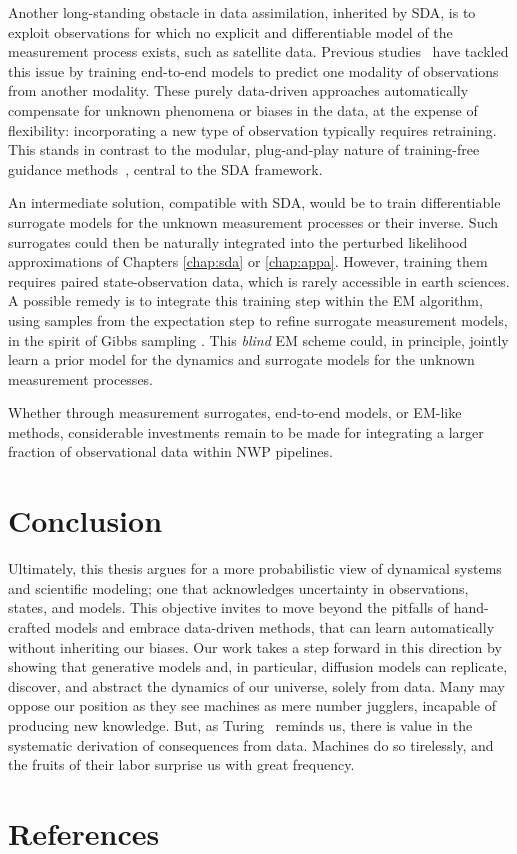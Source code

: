Another long-standing obstacle in data assimilation, inherited by SDA, is to exploit observations for which no explicit and differentiable model of the measurement process exists, such as satellite data. Previous studies~\cite{andrychowicz2023deep, alexe2024graphdop, allen2025endtoend} have tackled this issue by training end-to-end models to predict one modality of observations from another modality. These purely data-driven approaches automatically compensate for unknown phenomena or biases in the data, at the expense of flexibility: incorporating a new type of observation typically requires retraining. This stands in contrast to the modular, plug-and-play nature of training-free guidance methods~\cite{chung2023diffusion, song2023pseudoinverseguided, boys2023tweedie}, central to the SDA framework.

An intermediate solution, compatible with SDA, would be to train differentiable surrogate models for the unknown measurement processes \cite{chevallier2000use} or their inverse. Such surrogates could then be naturally integrated into the perturbed likelihood approximations of Chapters \ref{chap:sda} or \ref{chap:appa}. However, training them requires paired state-observation data, which is rarely accessible in earth sciences. A possible remedy is to integrate this training step within the EM algorithm, using samples from the expectation step to refine surrogate measurement models, in the spirit of Gibbs sampling \cite{geman1984stochastic, heurtel-depeiges2024listening}. This \emph{blind} EM scheme could, in principle, jointly learn a prior model for the dynamics and surrogate models for the unknown measurement processes.

Whether through measurement surrogates, end-to-end models, or EM-like methods, considerable investments remain to be made for integrating a larger fraction of observational data within NWP pipelines.

\vspace{-1ex}
\section{Conclusion}

Ultimately, this thesis argues for a more probabilistic view of dynamical systems and scientific modeling; one that acknowledges uncertainty in observations, states, and models. This objective invites to move beyond the pitfalls of hand-crafted models and embrace data-driven methods, that can learn automatically without inheriting our biases. Our work takes a step forward in this direction by showing that generative models and, in particular, diffusion models can replicate, discover, and abstract the dynamics of our universe, solely from data. Many may oppose our position as they see machines as mere number jugglers, incapable of producing new knowledge. But, as Turing~\cite{turing1950computing} reminds us, there is value in the systematic derivation of consequences from data. Machines do so tirelessly, and the fruits of their labor surprise us with great frequency.

\clearpage
\section*{References}

\printbibliography[heading=none]
